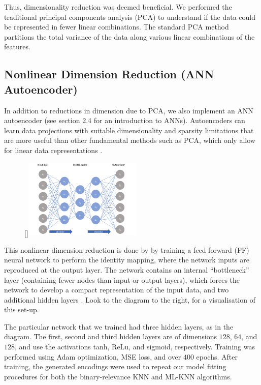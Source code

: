 \documentclass[11pt]{article}
\begin{document}
Thus, dimensionality reduction was deemed beneficial. We performed the traditional principal components analysis (PCA) to understand if the data could be represented in fewer linear combinations. The standard PCA method partitions the total variance of the data along various linear combinations of the features. 

\subsection{Nonlinear Dimension Reduction (ANN Autoencoder)}

In addition to reductions in dimension due to PCA, we also implement an ANN autoencoder (see section 2.4 for an introduction to ANNs). Autoencoders can learn data projections with suitable dimensionality and sparsity limitations that are more useful than other fundamental methods such as PCA, which only allow for linear data representations \autocite{Alkhayrat}.

\begin{figure}
    \begin{center}
        \raisebox{0pt}[\dimexpr{}\baselineskip\relax]{\includegraphics[width=0.5\textwidth]{autoencoder_diagram.png}}
    \end{center}
\end{figure}

This nonlinear dimension reduction is done by by training a feed forward (FF) neural network to perform the identity mapping, where the network inputs are reproduced at the output layer. The network contains an internal “bottleneck” layer (containing fewer nodes than input or output layers), which forces the network to develop a compact representation of the input data, and two additional hidden layers \autocite{Kramer}. Look to the diagram to the right, for a visualisation of this set-up. 

The particular network that we trained had three hidden layers, as in the diagram. The first, second and third hidden layers are of dimensions $128$, $64$, and $128$, and use the activations tanh, ReLu, and sigmoid, respectively. Training was performed using Adam optimization, MSE loss, and over $400$ epochs. After training, the generated encodings were used to repeat our model fitting procedures for both the binary-relevance KNN and ML-KNN algorithms. 
\end{document}
